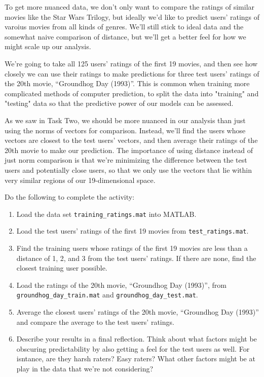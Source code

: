 \documentclass{ximera}
\begin{document}
\begin{exploration}
  
    To get more nuanced data, we don't only want to compare the ratings of similar movies like the Star Wars Trilogy, but ideally we'd like to predict users' ratings of varoius movies from all kinds of genres. We'll still stick to ideal data and the somewhat naive comparison of distance, but we'll get a better feel for how we might scale up our analysis.

    We're going to take all 125 users' ratings of the first 19 movies, and then see how closely we can use their ratings to make predictions for three test users' ratings of the 20th movie, ``Groundhog Day (1993)''. This is common when training more complicated methods of computer prediction, to split the data into "training" and "testing" data so that the predictive power of our models can be assessed.

    As we saw in Task Two, we should be more nuanced in our analysis than just using the norms of vectors for comparison. Instead, we'll find the users whose vectors are closest to the test users' vectors, and then average their ratings of the 20th movie to make our prediction. The importance of using distance instead of just norm comparison is that we're minimizing the difference between the test users and potentially close users, so that we only use the vectors that lie within very similar regions of our 19-dimensional space.


    Do the following to complete the activity:

  \begin{enumerate}

      \item Load the data set \texttt{training\_ratings.mat} into MATLAB.
      \item Load the test users' ratings of the first 19 movies from \texttt{test\_ratings.mat}.
      \item Find the training users whose ratings of the first 19 movies are less than a distance of 1, 2, and 3 from the test users' ratings. If there are none, find the closest training user possible.
      \item Load the ratings of the 20th movie, ``Groundhog Day (1993)'', from \texttt{groundhog\_day\_train.mat} and \texttt{groundhog\_day\_test.mat}.
      \item Average the closest users' ratings of the 20th movie, ``Groundhog Day (1993)'' and compare the average to the test users' ratings.
      \item Describe your results in a final reflection. Think about what factors might be obscuring predictability by also getting a feel for the test users as well. For isntance, are they harsh raters? Easy raters? What other factors might be at play in the data that we're not considering?
  \end{enumerate}


\end{exploration}
\end{document}
